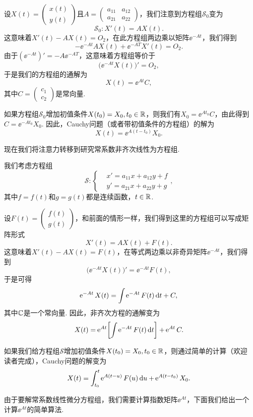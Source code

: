 设$X(t)=\begin{pmatrix}
  x(t) \\ y(t)
\end{pmatrix}$且$A=\begin{pmatrix}
  a_{11} & a_{12} \\
  a_{21} & a_{22}
\end{pmatrix}$，我们注意到方程组$\mathscr S_0$变为
\[
  \mathscr S_0: X'(t) = AX(t).
\]
这意味着$X'(t)-AX(t)=O_2$，在此方程组两边乘以矩阵$\ee^{-At}$，我们得到
\[
  -\ee^{-At}AX(t) + \ee^{-AT}X'(t) = O_2.
\]
由于$(\ee^{-At})'=-A\ee^{-AT}$，这意味着方程组等价于
\[
  \big( \ee^{-At}X(t) \big)' = O_2,
\]
于是我们的方程组的通解为
\[
  X(t) = \ee^{At}C,
\]
其中$C=\begin{pmatrix}
  c_1 \\ c_2
\end{pmatrix}$是常向量.

如果方程组$\mathscr S_0$增加初值条件$X(t_0)=X_0,t_0\in\mathbb R$，则我们有$X_0=\ee^{At_0}C$，由此得到$C=\ee^{-At_0}X_0$. 因此，{\kaishu Cauchy问题}（或者带初值条件的方程组）的解为
\[
  X(t) = \ee^{A(t-t_0)}X_0.
\]

现在我们将注意力转移到研究常系数非齐次线性为方程组.

我们考虑方程组
\[
  \mathscr S: \left\{
    \begin{aligned}
      & x' = a_{11}x + a_{12}y + f\\
      & y' = a_{21}x + a_{22}y + g
    \end{aligned}
  \right.,
\]
其中$f=f(t)$和$g=g(t)$都是连续函数，$t\in\mathbb R$.

设$F(t)=\begin{pmatrix}
  f(t) \\ g(t)
\end{pmatrix}$，和前面的情形一样，我们得到这里的方程组可以写成矩阵形式
\[
  X'(t) = AX(t) + F(t).
\]
这意味着$X'(t)-AX(t)=F(t)$，在等式两边乘以非奇异矩阵$\ee^{-At}$，我们得到
\[
  \big( \ee^{-At}X(t) \big)' = \ee^{-At}F(t),
\]
于是可得
\[
  \operatorname{\!\!\;\mathrm e}^{-At}X(t) = \int\operatorname{\!\!\;\mathrm e}^{-At}F(t)\mathop{}\!\mathrm d t + C,
\]
其中$\mathbb C$是一个常向量. 因此，非齐次方程的通解变为
\[
  X(t) = \ee^{At} \left[ \int\ee^{-At}F(t)\dif t \right] + \ee^{At}C.
\]

如果我们给方程组$\mathscr S$增加初值条件$X(t_0)=X_0,t_0\in\mathbb R$，则通过简单的计算（欢迎读者完成），Cauchy问题的解变为
\[
  X(t) = \int_{t_0}^t \operatorname{\!\!\;\mathrm e}^{A(t-u)}F(u)\mathop{}\!\mathrm d u + \operatorname{\!\!\;\mathrm e}^{A(t-t_0)}X_0.
\]

由于要解常系数线性微分方程组，我们需要计算指数矩阵$\ee^{At}$，下面我们给出一个计算$\ee^{At}$的简单算法.

